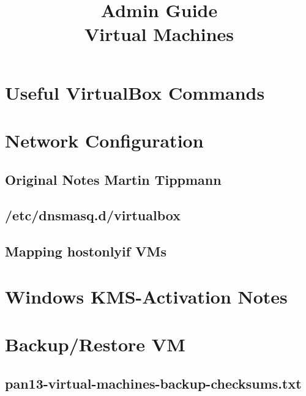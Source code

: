 \documentclass[11pt]{report}
\title{Admin Guide\\Virtual Machines}
\author{}
\date{}
\begin{document}
\maketitle

\tableofcontents
\clearpage






\appendix
\chapter{Useful VirtualBox Commands}


\chapter{Network Configuration}\label{network-configuration}
\section{Original Notes Martin Tippmann}


\section{/etc/dnsmasq.d/virtualbox}\label{dnsmasq-d-virtualbox}


\section{Mapping hostonlyif VMs}\label{mapping-hostonlyif-vms}


\chapter{Windows KMS-Activation Notes}\label{kms}


\chapter{Backup/Restore VM}\label{checksums}
\section{pan13-virtual-machines-backup-checksums.txt}

\end{document}
